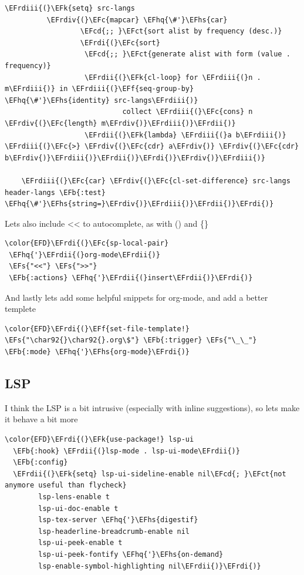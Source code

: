 \documentclass{scrartcl}
\newcommand{\EFk}[1]{\textcolor{EFk}{#1}} %
\newcommand{\EFs}[1]{\textcolor{EFs}{#1}} %
\newcommand{\EFb}[1]{\textcolor{EFb}{#1}} %
\newcommand{\EFct}[1]{\textcolor{EFct}{#1}} %
\newcommand{\EFc}[1]{\textcolor{EFc}{#1}} %
\newcommand{\EFf}[1]{\textcolor{EFf}{#1}} %
\newcommand{\EFcd}[1]{\textcolor{EFcd}{#1}} %
\newcommand{\EFhq}[1]{\textcolor{EFhq}{#1}} %
\newcommand{\EFhs}[1]{\textcolor{EFhs}{#1}} %
\newcommand{\EFrdi}[1]{\textcolor{EFrdi}{#1}} %
\newcommand{\EFrdii}[1]{\textcolor{EFrdii}{#1}} %
\newcommand{\EFrdiii}[1]{\textcolor{EFrdiii}{#1}} %
\newcommand{\EFrdiv}[1]{\textcolor{EFrdiv}{#1}} %
\begin{document}
\begin{Code}
\begin{Verbatim}[]
    \EFrdiii{(}\EFk{setq} src-langs
          \EFrdiv{(}\EFc{mapcar} \EFhq{\#'}\EFhs{car}
                  \EFcd{;; }\EFct{sort alist by frequency (desc.)}
                  \EFrdi{(}\EFc{sort}
                   \EFcd{;; }\EFct{generate alist with form (value . frequency)}
                   \EFrdii{(}\EFk{cl-loop} for \EFrdiii{(}n . m\EFrdiii{)} in \EFrdiii{(}\EFf{seq-group-by} \EFhq{\#'}\EFhs{identity} src-langs\EFrdiii{)}
                            collect \EFrdiii{(}\EFc{cons} n \EFrdiv{(}\EFc{length} m\EFrdiv{)}\EFrdiii{)}\EFrdii{)}
                   \EFrdii{(}\EFk{lambda} \EFrdiii{(}a b\EFrdiii{)} \EFrdiii{(}\EFc{>} \EFrdiv{(}\EFc{cdr} a\EFrdiv{)} \EFrdiv{(}\EFc{cdr} b\EFrdiv{)}\EFrdiii{)}\EFrdii{)}\EFrdi{)}\EFrdiv{)}\EFrdiii{)}

    \EFrdiii{(}\EFc{car} \EFrdiv{(}\EFc{cl-set-difference} src-langs header-langs \EFb{:test} \EFhq{\#'}\EFhs{string=}\EFrdiv{)}\EFrdiii{)}\EFrdii{)}\EFrdi{)}
\end{Verbatim}
\end{Code}

Lets also include << to autocomplete, as with () and \{\}
\begin{Code}
\begin{Verbatim}[]
\color{EFD}\EFrdi{(}\EFc{sp-local-pair}
 \EFhq{'}\EFrdii{(}org-mode\EFrdii{)}
 \EFs{"<<"} \EFs{">>"}
 \EFb{:actions} \EFhq{'}\EFrdii{(}insert\EFrdii{)}\EFrdi{)}
\end{Verbatim}
\end{Code}

And lastly lets add some helpful snippets for org-mode, and add a better templete
\begin{Code}
\begin{Verbatim}[]
\color{EFD}\EFrdi{(}\EFf{set-file-template!} \EFs{"\char92{}\char92{}.org\$"} \EFb{:trigger} \EFs{"\_\_"} \EFb{:mode} \EFhq{'}\EFhs{org-mode}\EFrdi{)}
\end{Verbatim}
\end{Code}

\subsection{LSP}
\label{sec:org45f8abd}
I think the LSP is a bit intrusive (especially with inline suggestions), so lets make it behave a bit more
\begin{Code}
\begin{Verbatim}[]
\color{EFD}\EFrdi{(}\EFk{use-package!} lsp-ui
  \EFb{:hook} \EFrdii{(}lsp-mode . lsp-ui-mode\EFrdii{)}
  \EFb{:config}
  \EFrdii{(}\EFk{setq} lsp-ui-sideline-enable nil\EFcd{; }\EFct{not anymore useful than flycheck}
        lsp-lens-enable t
        lsp-ui-doc-enable t
        lsp-tex-server \EFhq{'}\EFhs{digestif}
        lsp-headerline-breadcrumb-enable nil
        lsp-ui-peek-enable t
        lsp-ui-peek-fontify \EFhq{'}\EFhs{on-demand}
        lsp-enable-symbol-highlighting nil\EFrdii{)}\EFrdi{)}
\end{Verbatim}
\end{Code}
\end{document}
